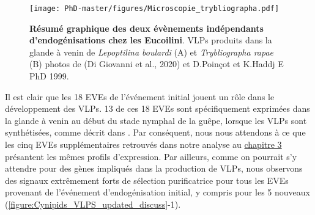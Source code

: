 \begin{figure}[!htpbt]
\captionsetup{font=footnotesize}
 \centering
  \texttt{[image: PhD-master/figures/Microscopie\_trybliographa.pdf]}
\caption[Discuss:Résumé graphique des deux évènements indépendants d'endogénisations chez les Eucoilini]{\textbf{Résumé graphique des deux évènements indépendants d'endogénisations chez les Eucoilini}. VLPs produits dans la glande à venin de \textit{Lepoptilina boulardi} (A) et \textit{Trybliographa rapae} (B)  photos de (Di Giovanni et al., 2020) et D.Poinçot et K.Haddj E PhD 1999.}
\label{figure:Microscopie_trybliographa}
\end{figure}

Il est clair que les 18 EVEs de l'événement initial jouent un rôle dans le développement des VLPs. 13 de ces 18 EVEs sont spécifiquement exprimées dans la glande à venin au début du stade nymphal de la guêpe, lorsque les VLPs sont synthétisées, comme décrit dans \cite{di_giovanni_behavior-manipulating_2020}. Par conséquent, nous nous attendons à ce que les cinq EVEs supplémentaires retrouvés dans notre analyse au \hyperref[sec:chap3]{chapitre 3} présantent les mêmes profils d'expression. Par ailleurs, comme on pourrait s'y attendre pour des gènes impliqués dans la production de VLPs, nous observons des signaux extrêmement forts de sélection purificatrice pour tous les EVEs provenant de l'événement d'endogénisation initial, y compris pour les 5 nouveaux (\figurename{\ref{figure:Cynipids_VLPS_updated_discuss}}-1).\\ 

